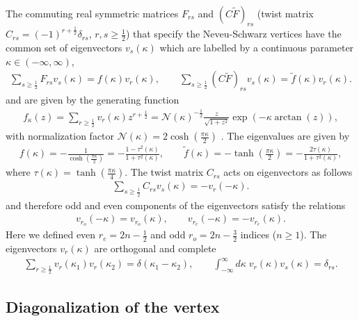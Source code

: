 \documentclass[a4paper,12pt]{article}
\begin{document}
The commuting real symmetric matrices $F_{rs}$ and $(C\tilde{F})_{rs}$
(twist matrix $C_{rs}=(-1)^{r+\tfrac12}\delta_{rs}$, $r,s\geq \frac12$)
that specify
the Neveu-Schwarz vertices have the common set of eigenvectors
$v_{s}(\kappa)$ which
are labelled by a continuous parameter $\kappa\in(-\infty,\infty)$,
\begin{gather}
\sum_{s\geq\tfrac12}F_{rs}v_{s}(\kappa)
=f(\kappa)v_{r}(\kappa),\qquad
\sum_{s\geq\tfrac12}(C\tilde{F})_{rs}v_{s}(\kappa)
=\tilde{f}(\kappa)v_{r}(\kappa).
\end{gather}
and are given by the generating
function \cite{0112231}
\begin{gather}
f_{\kappa}(z)
=\sum_{r\geq\tfrac12}v_{r}(\kappa)z^{r+\tfrac12}
=\mathcal{N}(\kappa)^{-\tfrac12}
\frac{z}{\sqrt{1+z^{2}}}\exp(-\kappa\arctan(z)),
\end{gather}
with  normalization factor
$\mathcal{N}(\kappa)=2\cosh\left(\frac{\pi\kappa}{2}\right)$ \cite{0203227}.
The eigenvalues are given by \cite{0112231}
\begin{gather}
f(\kappa)=-\frac{1}{\cosh(\frac{\pi\kappa}{2})}
=-\frac{1-\tau^2(\kappa)}{1+\tau^2(\kappa)},\qquad
\tilde{f}(\kappa)=-\tanh\left(\frac{\pi\kappa}{2}\right)
=-\frac{2\tau(\kappa)}{1+\tau^2(\kappa)},
\end{gather}
where $\tau(\kappa)=\tanh(\frac{\pi\kappa}{4})$.
The twist matrix $C_{rs}$ acts on eigenvectors as follows
\begin{gather}
\sum_{s\geq\tfrac12}C_{rs}v_{s}(\kappa)=-v_{r}(-\kappa).
\end{gather}
and therefore odd and even components of
the eigenvectors satisfy the relations
\begin{gather}
v_{r_o}(-\kappa)=v_{r_o}(\kappa),\qquad
v_{r_e}(-\kappa)=-v_{r_e}(\kappa).\label{even-odd}
\end{gather}
Here we defined even $r_{e}=2n-\tfrac12$ and odd $r_{o}=2n-\tfrac32$
indices ($n\geq1$).
The eigenvectors $v_{r}(\kappa)$ are orthogonal and complete \cite{0203227}
\begin{gather}
\sum_{r\geq\tfrac12}v_{r}(\kappa_{1})v_{r}(\kappa_{2})
=\delta(\kappa_{1}-\kappa_{2}),\qquad
\int_{-\infty}^{\infty}d\kappa\;
v_{r}(\kappa)v_{s}(\kappa)=\delta_{rs}.
\label{comp-ortog}
\end{gather}

\subsection{Diagonalization of the vertex}
\end{document}
